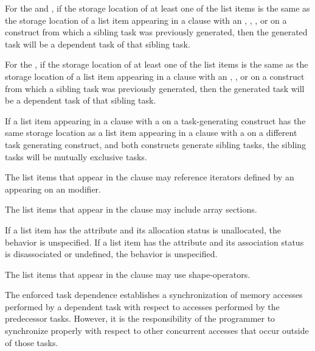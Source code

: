 For the  and  , if the storage 
location of at least one of the list items is the same as the storage location 
of a list item appearing in a  clause with an , , 
, or   on a construct from 
which a sibling task was previously generated, then the generated task will be 
a dependent task of that sibling task.

For the  , if the storage location of 
at least one of the list items is the same as the storage location of a list 
item appearing in a  clause with an , , or 
  on a construct from which a sibling task 
was previously generated, then the generated task will be a dependent task 
of that sibling task.

If a list item appearing in a  clause with a 
 on a task-generating construct has the same storage location as
a list item appearing in a  clause with a 
 on a different task generating construct, and both constructs
generate sibling tasks, the sibling tasks will be mutually exclusive tasks.

The list items that appear in the  clause may reference iterators
defined by an  appearing on an  modifier.

The list items that appear in the  clause may include array sections.

\begin{fortranspecific}
If a list item has the  attribute and its allocation
status is unallocated, the behavior is unspecified. If a list item has
the  attribute and its association status is
disassociated or undefined, the behavior is unspecified.
\end{fortranspecific}

\begin{ccppspecific}
The list items that appear in the  clause may use shape-operators.
\end{ccppspecific}

\begin{note}
The enforced task dependence establishes a synchronization of memory
accesses performed by a dependent task with respect to accesses performed by the
predecessor tasks. However, it is the responsibility of the programmer to synchronize properly with respect to other concurrent accesses that occur outside of those tasks.
\end{note}

